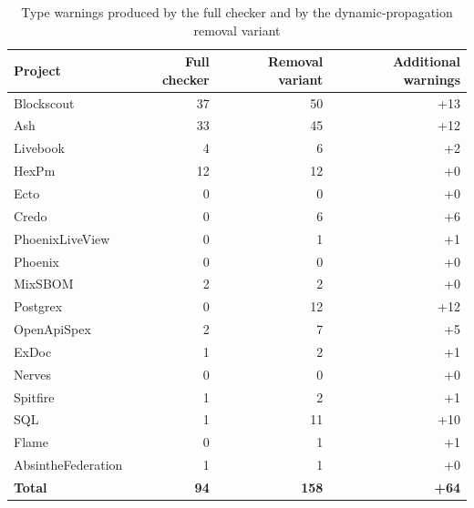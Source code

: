 \begin{table}[ht]
\centering
\small
\begin{tabular}{|l|r|r|r|}
\hline\rowcolor{violet2}
\textbf{Project} & \textbf{Full checker} & \textbf{Removal variant} & \textbf{Additional warnings} \\[-1pt]
\hline
Blockscout & 37 & 50 & +13 \\[-1.5pt]
\rowcolor{violet1}
Ash & 33 & 45 & +12 \\[-1.5pt]
Livebook & 4 & 6 & +2 \\[-1.5pt]
\rowcolor{violet1}
HexPm & 12 & 12 & +0 \\[-1.5pt]
Ecto & 0 & 0 & +0 \\[-1.5pt]
\rowcolor{violet1}
Credo & 0 & 6 & +6 \\[-1.5pt]
PhoenixLiveView & 0 & 1 & +1 \\[-1.5pt]
\rowcolor{violet1}
Phoenix & 0 & 0 & +0 \\[-1.5pt]
MixSBOM & 2 & 2 & +0 \\[-1.5pt]
\rowcolor{violet1}
Postgrex & 0 & 12 & +12 \\[-1.5pt]
OpenApiSpex & 2 & 7 & +5 \\[-1.5pt]
\rowcolor{violet1}
ExDoc & 1 & 2 & +1 \\[-1.5pt]
Nerves & 0 & 0 & +0 \\[-1.5pt]
\rowcolor{violet1}
Spitfire & 1 & 2 & +1 \\[-1.5pt]
SQL & 1 & 11 & +10 \\[-1.5pt]
\rowcolor{violet1}
Flame & 0 & 1 & +1 \\[-1.5pt]
AbsintheFederation & 1 & 1 & +0 \\[-1.5pt]
\hline
\textbf{Total} & \textbf{94} & \textbf{158} & \textbf{+64} \\[-1.5pt]
\hline
\end{tabular}
\caption{Type warnings produced by the full checker and by the dynamic-propagation removal variant}
\label{tab:dynamic_propagation_removal}
\end{table}
